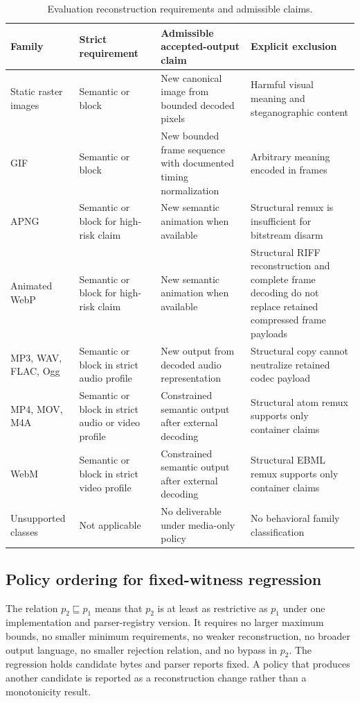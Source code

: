 \begin{table}[tb]
\centering
\caption{Evaluation reconstruction requirements and admissible claims.}
\label{tab:reconstruction-register}
\small
\begin{tabularx}{\textwidth}{L{0.19\textwidth}L{0.20\textwidth}Y L{0.25\textwidth}}
\toprule
Family & Strict requirement & Admissible accepted-output claim & Explicit exclusion \\
\midrule
Static raster images & Semantic or block & New canonical image from bounded decoded pixels & Harmful visual meaning and steganographic content \\
GIF & Semantic or block & New bounded frame sequence with documented timing normalization & Arbitrary meaning encoded in frames \\
APNG & Semantic or block for high-risk claim & New semantic animation when available & Structural remux is insufficient for bitstream disarm \\
Animated WebP & Semantic or block for high-risk claim & New semantic animation when available & Structural RIFF reconstruction and complete frame decoding do not replace retained compressed frame payloads \\
MP3, WAV, FLAC, Ogg & Semantic or block in strict audio profile & New output from decoded audio representation & Structural copy cannot neutralize retained codec payload \\
MP4, MOV, M4A & Semantic or block in strict audio or video profile & Constrained semantic output after external decoding & Structural atom remux supports only container claims \\
WebM & Semantic or block in strict video profile & Constrained semantic output after external decoding & Structural EBML remux supports only container claims \\
Unsupported classes & Not applicable & No deliverable under media-only policy & No behavioral family classification \\
\bottomrule
\end{tabularx}
\end{table}

\subsection{Policy ordering for fixed-witness regression}
\label{subsec:policy-ordering}

The relation $p_2\sqsubseteq p_1$ means that $p_2$ is at least as restrictive
as $p_1$ under one implementation and parser-registry version. It requires no
larger maximum bounds, no smaller minimum requirements, no weaker
reconstruction, no broader output language, no smaller rejection relation, and
no bypass in $p_2$. The regression holds candidate bytes and parser reports
fixed. A policy that produces another candidate is reported as a reconstruction
change rather than a monotonicity result.

